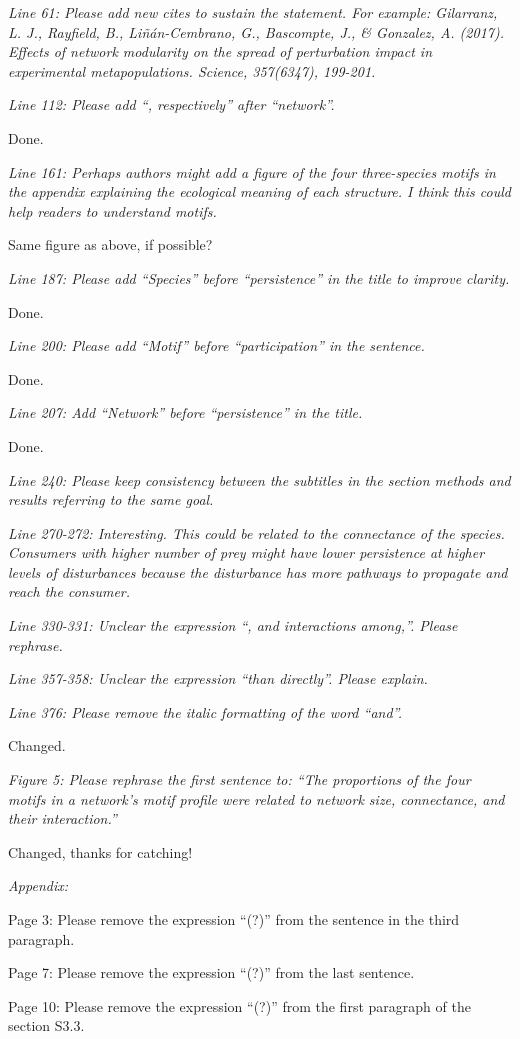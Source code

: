\documentclass[12pt]{article}
\newcommand{\us}{\rm \setlength{\leftskip}{0.3cm} \setlength{\rightskip}{0.3cm}}
\newcommand{\them}{\it \setlength{\leftskip}{0cm} \setlength{\rightskip}{0cm}}
\begin{document}
\them
Line 61: Please add new cites to sustain the statement. For example:
Gilarranz, L. J., Rayfield, B., Liñán-Cembrano, G., Bascompte, J., \& Gonzalez, A. (2017). Effects of network modularity on the spread of perturbation impact in experimental metapopulations. Science, 357(6347), 199-201.

\us

\them
Line 112: Please add “, respectively” after “network”.

\us
Done.

\them
Line 161: Perhaps authors might add a figure of the four three-species motifs in the appendix explaining the ecological meaning of each structure. I think this could help readers to understand motifs.

\us Same figure as above, if possible?

\them
Line 187: Please add “Species” before “persistence” in the title to improve clarity.

\us
Done.

\them
Line 200: Please add “Motif” before “participation” in the sentence.

\us
Done.

\them
Line 207: Add “Network” before “persistence” in the title.

\us
Done.

\them
Line 240: Please keep consistency between the subtitles in the section methods and results referring to the same goal.

\us

\them
Line 270-272: Interesting. This could be related to the connectance of the species. Consumers with higher number of prey might have lower persistence at higher levels of disturbances because the disturbance has more pathways to propagate and reach the consumer.

\us 

\them
Line 330-331: Unclear the expression “, and interactions among,”. Please rephrase.

\us

\them
Line 357-358: Unclear the expression “than directly”. Please explain.

\us

\them
Line 376: Please remove the italic formatting of the word “and”.

\us
Changed.

\them
Figure 5: Please rephrase the first sentence to: “The proportions of the four motifs in a network's motif profile were related to network size, connectance, and their interaction.”

\us
Changed, thanks for catching!

\them
Appendix:

Page 3: Please remove the expression “(?)” from the sentence in the third paragraph.

Page 7: Please remove the expression “(?)” from the last sentence.

Page 10: Please remove the expression “(?)” from the first paragraph of the section S3.3.
\us
\end{document}
